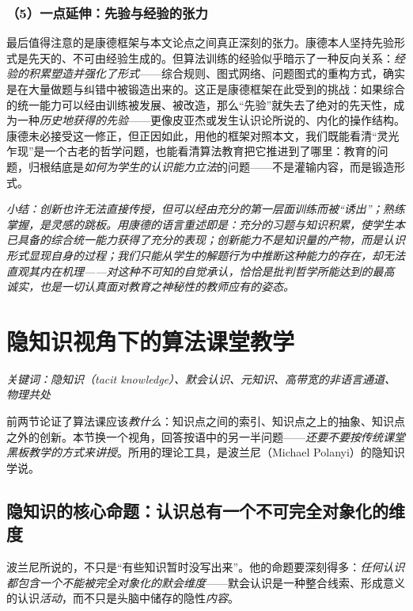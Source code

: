 \subsubsection{（5）一点延伸：先验与经验的张力}

最后值得注意的是康德框架与本文论点之间真正深刻的张力。康德本人坚持先验形式是先天的、不可由经验生成的。但算法训练的经验似乎暗示了一种反向关系：\textit{经验的积累塑造并强化了形式}——综合规则、图式网络、问题图式的重构方式，确实是在大量做题与纠错中被锻造出来的。这正是康德框架在此受到的挑战：如果综合的统一能力可以经由训练被发展、被改造，那么“先验”就失去了绝对的先天性，成为一种\textit{历史地获得的先验}——更像皮亚杰或发生认识论所说的、内化的操作结构。康德未必接受这一修正，但正因如此，用他的框架对照本文，我们既能看清“灵光乍现”是一个古老的哲学问题，也能看清算法教育把它推进到了哪里：教育的问题，归根结底是\textit{如何为学生的认识能力立法}的问题——不是灌输内容，而是锻造形式。

\medskip

\nid\textit{小结：创新也许无法直接传授，但可以经由充分的第一层面训练而被“诱出”；熟练掌握，是灵感的跳板。用康德的语言重述即是：充分的习题与知识积累，使学生本已具备的综合统一能力获得了充分的表现；创新能力不是知识量的产物，而是认识形式显现自身的过程；我们只能从学生的解题行为中推断这种能力的存在，却无法直观其内在机理——对这种不可知的自觉承认，恰恰是批判哲学所能达到的最高诚实，也是一切认真面对教育之神秘性的教师应有的姿态。}

\section{隐知识视角下的算法课堂教学}


\noindent\textit{关键词：隐知识（tacit knowledge）、默会认识、元知识、高带宽的非语言通道、物理共处}

前两节论证了算法课应该\textit{教什么}：知识点之间的索引、知识点之上的抽象、知识点之外的创新。本节换一个视角，回答按语中的另一半问题——\textit{还要不要按传统课堂黑板教学的方式来讲授}。所用的理论工具，是波兰尼（Michael Polanyi）的隐知识学说。

\subsection{隐知识的核心命题：认识总有一个不可完全对象化的维度}

波兰尼所说的，不只是“有些知识暂时没写出来”。他的命题要深刻得多：\textit{任何认识都包含一个不能被完全对象化的默会维度}——默会认识是一种整合线索、形成意义的认识\textit{活动}，而不只是头脑中储存的隐性\textit{内容}。

